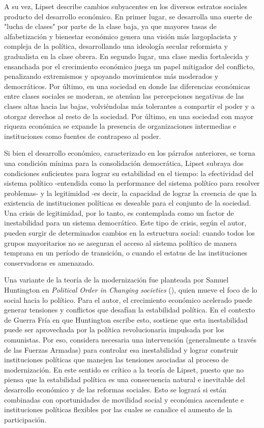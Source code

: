 \documentclass{article}
\begin{document}
A su vez, Lipset describe cambios subyacentes en los diversos estratos sociales producto
del desarrollo económico. En primer lugar, se desarrolla una suerte de "lucha de clases" por 
parte de la clase baja, ya que mayores tasas de alfabetización y bienestar económico genera 
una visión más largoplacista y compleja de la política, desarrollando una ideología secular
reformista y gradualista en la clase obrera. En segundo lugar, una clase media fortalecida y 
ensanchada por el crecimiento económico juega un papel mitigador del conflicto, penalizando 
extremismos y apoyando movimientos más moderados y democráticos. Por último, en una sociedad 
en donde las diferencias económicas entre clases sociales se moderan, se atenúan las 
percepciones negativas de las clases altas hacia las bajas, volviéndolas más tolerantes a 
compartir el poder y a otorgar derechos al resto de la sociedad. Por último, en una sociedad 
con mayor riqueza económica se expande la presencia de organizaciones intermedias e 
instituciones como fuentes de contrapeso al poder.

Si bien el desarrollo económico, caracterizado en los párrafos anteriores, se torna una
condición mínima para la consolidación democrática, Lipset subraya dos condiciones 
suficientes para lograr su estabilidad en el tiempo: la efectividad del sistema político 
-entendida como la performance del sistema político para resolver problemas- y la 
legitimidad -es decir, la capacidad de lograr la creencia de que la existencia de 
instituciones políticas es deseable para el conjunto de la sociedad. Una crisis de 
legitimidad, por lo tanto, es contemplada como un factor de inestabilidad para un sistema 
democrático. Este tipo de crisis, según el autor, pueden surgir de determinados cambios 
en la estructura social: cuando todos los grupos mayoritarios no se aseguran el acceso al 
sistema político de manera temprana en un período de transición, o cuando el estatus de 
las instituciones conservadoras es amenazado.

Una variante de la teoría de la modernización fue planteada por Samuel Huntington 
en \textit{Political Order in Changing societies} (\citeyear{huntington68political}),
quien mueve el foco de lo social hacia lo político. Para el autor, el crecimiento 
económico acelerado puede generar tensiones y conflictos que desafían la estabilidad
política. En el contexto de Guerra Fría en que Huntington escribe esto, sostiene que
esta inestabilidad puede ser aprovechada por la política revolucionaria impulsada por
los comunistas. Por eso, considera necesaria una intervención (generalmente a través
de las Fuerzas Armadas) para controlar esa inestabilidad y lograr construir instituciones
políticas que manejen las tensiones asociadas al proceso de modernización. En este 
sentido es crítico a la teoría de Lipset, puesto que no piensa que la estabilidad política
es una consecuencia natural e inevitable del desarrollo económico y de las reformas 
sociales. Esto se logrará si están combinadas con oportunidades de movilidad social y
económica ascendente e instituciones políticas flexibles por las cuales se canalice
el aumento de la participación.
\end{document}
